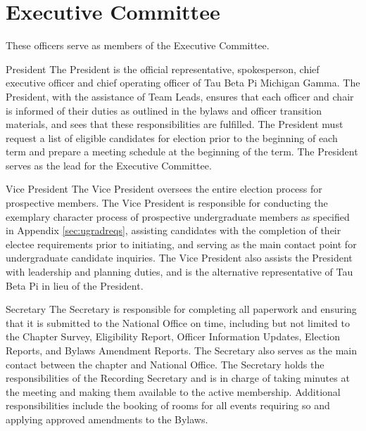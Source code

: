 \section{Executive Committee}\label{sec:ExecComm}
These officers serve as members of the Executive Committee.
\begin{enumsubsection}
\item{President}
The President is the official representative, spokesperson, chief executive officer and chief operating officer of Tau Beta Pi Michigan Gamma.
The President, with the assistance of Team Leads, ensures that each officer and chair is informed of their duties as outlined in the bylaws and officer transition materials, and sees that these responsibilities are fulfilled.
The President must request a list of eligible candidates for election prior to the beginning of each term and prepare a meeting schedule at the beginning of the term.
The President serves as the lead for the Executive Committee.

\item{Vice President}
The Vice President oversees the entire election process for prospective members.
The Vice President is responsible for conducting the exemplary character process of prospective undergraduate members as specified in Appendix \ref{sec:ugradreqs}, 
assisting candidates with the completion of their electee requirements prior to initiating, and serving as the main contact point for undergraduate candidate inquiries.
The Vice President also assists the President with leadership and planning duties, and is the alternative representative of Tau Beta Pi in lieu of the President.

\item{Secretary}
The Secretary is responsible for completing all paperwork and ensuring that it is submitted to the National Office on time, 
including but not limited to the Chapter Survey, Eligibility Report, Officer Information Updates, Election Reports, and Bylaws Amendment Reports. 
The Secretary also serves as the main contact between the chapter and National Office. 
The Secretary holds the responsibilities of the Recording Secretary and is in charge of taking minutes at the meeting and making them available to the active membership. 
Additional responsibilities include the booking of rooms for all events requiring so and applying approved amendments to the Bylaws.


\end{enumsubsection}
